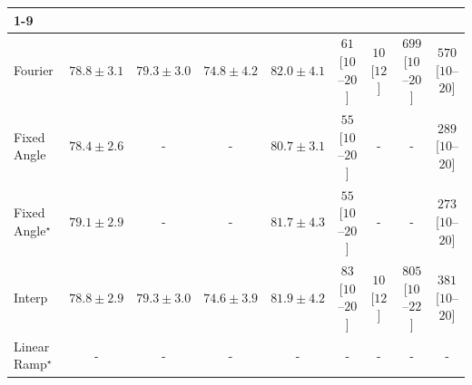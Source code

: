 \begin{tabular}{l|cccc|cccc|}
\cline{1-9}
\multicolumn{9}{c}{\rule{0pt}{8pt}SV} \\
\midrule
Fourier & {\cellcolor[HTML]{157AB5}} \color[HTML]{F1F1F1} $78.8\pm 3.1$ & {\cellcolor[HTML]{056FAE}} \color[HTML]{F1F1F1} $79.3\pm 3.0$ & {\cellcolor[HTML]{B0C2DE}} \color[HTML]{000000} $74.8\pm 4.2$ & {\cellcolor[HTML]{023858}} \color[HTML]{F1F1F1} $82.0\pm 4.1$ & {\cellcolor[HTML]{FEE9E6}} \color[HTML]{000000} $61$ [$10$--$20$] & {\cellcolor[HTML]{FFF6F2}} \color[HTML]{000000} $10$ [$12$] & {\cellcolor[HTML]{7C0177}} \color[HTML]{F1F1F1} $699$ [$10$--$20$] & {\cellcolor[HTML]{BD1186}} \color[HTML]{F1F1F1} $570$ [$10$--$20$] \\
Fixed Angle & {\cellcolor[HTML]{2383BA}} \color[HTML]{F1F1F1} $78.4\pm 2.6$ & {\cellcolor[HTML]{000000}} \color[HTML]{F1F1F1} {\cellcolor{white}} \color{black} - & {\cellcolor[HTML]{000000}} \color[HTML]{F1F1F1} {\cellcolor{white}} \color{black} - & {\cellcolor[HTML]{04588A}} \color[HTML]{F1F1F1} $80.7\pm 3.1$ & {\cellcolor[HTML]{FEEBE7}} \color[HTML]{000000} $55$ [$10$--$20$] & {\cellcolor[HTML]{000000}} \color[HTML]{F1F1F1} {\cellcolor{white}} \color{black} - & {\cellcolor[HTML]{000000}} \color[HTML]{F1F1F1} {\cellcolor{white}} \color{black} - & {\cellcolor[HTML]{FAA5B7}} \color[HTML]{000000} $289$ [$10$--$20$] \\
Fixed Angle$^\star$ & {\cellcolor[HTML]{0A73B2}} \color[HTML]{F1F1F1} $79.1\pm 2.9$ & {\cellcolor[HTML]{000000}} \color[HTML]{F1F1F1} {\cellcolor{white}} \color{black} - & {\cellcolor[HTML]{000000}} \color[HTML]{F1F1F1} {\cellcolor{white}} \color{black} - & {\cellcolor[HTML]{023E62}} \color[HTML]{F1F1F1} $81.7\pm 4.3$ & {\cellcolor[HTML]{FEEBE7}} \color[HTML]{000000} $55$ [$10$--$20$] & {\cellcolor[HTML]{000000}} \color[HTML]{F1F1F1} {\cellcolor{white}} \color{black} - & {\cellcolor[HTML]{000000}} \color[HTML]{F1F1F1} {\cellcolor{white}} \color{black} - & {\cellcolor[HTML]{FBAAB8}} \color[HTML]{000000} $273$ [$10$--$20$] \\
Interp & {\cellcolor[HTML]{157AB5}} \color[HTML]{F1F1F1} $78.8\pm 2.9$ & {\cellcolor[HTML]{056FAE}} \color[HTML]{F1F1F1} $79.3\pm 3.0$ & {\cellcolor[HTML]{B7C5DF}} \color[HTML]{000000} $74.6\pm 3.9$ & {\cellcolor[HTML]{023A5B}} \color[HTML]{F1F1F1} $81.9\pm 4.2$ & {\cellcolor[HTML]{FDE4E1}} \color[HTML]{000000} $83$ [$10$--$20$] & {\cellcolor[HTML]{FFF6F2}} \color[HTML]{000000} $10$ [$12$] & {\cellcolor[HTML]{49006A}} \color[HTML]{F1F1F1} $805$ [$10$--$22$] & {\cellcolor[HTML]{F875A6}} \color[HTML]{F1F1F1} $381$ [$10$--$20$] \\
Linear Ramp$^\star$ & {\cellcolor[HTML]{000000}} \color[HTML]{F1F1F1} {\cellcolor{white}} \color{black} - & {\cellcolor[HTML]{000000}} \color[HTML]{F1F1F1} {\cellcolor{white}} \color{black} - & {\cellcolor[HTML]{000000}} \color[HTML]{F1F1F1} {\cellcolor{white}} \color{black} - & {\cellcolor[HTML]{000000}} \color[HTML]{F1F1F1} {\cellcolor{white}} \color{black} - & {\cellcolor[HTML]{000000}} \color[HTML]{F1F1F1} {\cellcolor{white}} \color{black} - & {\cellcolor[HTML]{000000}} \color[HTML]{F1F1F1} {\cellcolor{white}} \color{black} - & {\cellcolor[HTML]{000000}} \color[HTML]{F1F1F1} {\cellcolor{white}} \color{black} - & {\cellcolor[HTML]{000000}} \color[HTML]{F1F1F1} {\cellcolor{white}} \color{black} - \\

\end{tabular}
